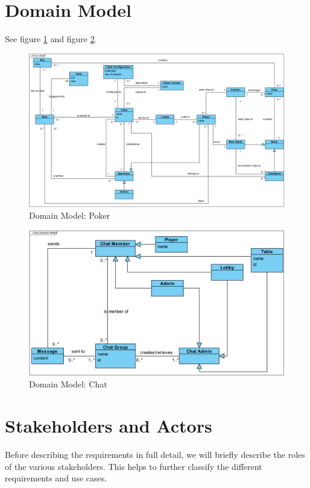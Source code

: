 \documentclass[a4paper,11pt]{report}
\begin{document}
\section{Domain Model}
See figure \ref{fig:domain_poker} and figure \ref{fig:domain_chat}.
\begin{figure}
  \begin{center}
    \includegraphics[angle=90, scale=0.6]{img_domain_model_poker.png}
  \end{center}
  \caption{Domain Model: Poker}\label{fig:domain_poker}
\end{figure}
\begin{figure}
  \begin{center}
    \includegraphics[scale=0.5]{img_domain_model_chat.png}
  \end{center}
  \caption{Domain Model: Chat}\label{fig:domain_chat}
\end{figure}
\section{Stakeholders and Actors}
Before  describing the requirements in full detail, we will briefly describe the roles of  the  various 
stakeholders. This helps to further classify the different requirements and use cases.
\end{document}
